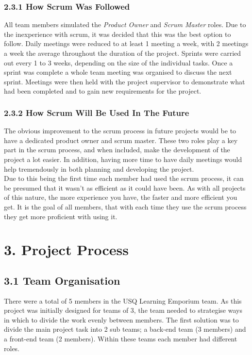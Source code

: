 \documentclass[11pt]{article}
\begin{document}
\begin{adjustwidth}{1cm}{}

\subsubsection{2.3.1 How Scrum Was Followed}
All team members simulated the \textit{Product Owner} and \textit{Scrum Master} roles. Due to the inexperience with scrum, it was decided that this was the best option to follow. Daily meetings were reduced to at least 1 meeting a week, with 2 meetings a week the average throughout the duration of the project. Sprints were carried out every 1 to 3 weeks, depending on the size of the individual tasks. Once a sprint was complete a whole team meeting was organised to discuss the next sprint. Meetings were then held with the project supervisor to demonstrate what had been completed and to gain new requirements for the project. 

\subsubsection{2.3.2 How Scrum Will Be Used In The Future}
The obvious improvement to the scrum process in future projects would be to have a dedicated product owner and scrum master. These two roles play a key part in the scrum process, and when included, make the development of the project a lot easier. In addition, having more time to have daily meetings would help tremendously in both planning and developing the project. \\

Due to this being the first time each member had used the scrum process, it can be presumed that it wasn't as efficient as it could have been. As with all projects of this nature, the more experience you have, the faster and more efficient you get. It is the goal of all members, that with each time they use the scrum process they get more proficient with using it.

\end{adjustwidth}



\section{3. Project Process}

\subsection{3.1 Team Organisation}
There were a total of 5 members in the USQ Learning Emporium team. As this project was initially designed for teams of 3, the team needed to strategise ways in which to divide the work evenly between members. The first solution was to divide the main project task into 2 sub teams; a back-end team (3 members) and a front-end team (2 members). Within these teams each member had different roles. \\
\end{document}
